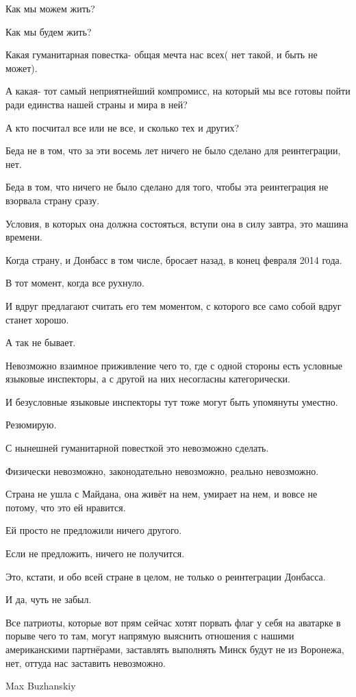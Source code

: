 Как мы можем жить?

Как мы будем жить?

Какая гуманитарная повестка- общая мечта нас всех( нет такой, и быть не может).

А какая- тот самый неприятнейший компромисс, на который мы все готовы пойти
ради единства нашей страны и мира в ней?

А кто посчитал все или не все, и сколько тех и других?

Беда не в том, что за эти восемь лет ничего не было сделано для реинтеграции,
нет.

Беда в том, что ничего не было сделано для того, чтобы эта реинтеграция не
взорвала страну сразу.

Условия, в которых она должна состояться, вступи она в силу завтра, это машина
времени.

Когда страну, и Донбасс в том числе, бросает назад, в конец февраля 2014 года.

В тот момент, когда все рухнуло.

И вдруг предлагают считать его тем моментом, с которого все само собой вдруг
станет хорошо.

А так не бывает.

Невозможно взаимное приживление чего то, где с одной стороны есть условные
языковые инспекторы, а с другой на них несогласны категорически.

И безусловные языковые инспекторы тут тоже могут быть упомянуты уместно.

Резюмирую.

С нынешней гуманитарной повесткой это невозможно сделать.

Физически невозможно, законодательно невозможно, реально невозможно.

Страна не ушла с Майдана, она живёт на нем, умирает на нем, и вовсе не потому,
что это ей нравится.

Ей просто не предложили ничего другого.

Если не предложить, ничего не получится.

Это, кстати, и обо всей стране в целом, не только о реинтеграции Донбасса.

И да, чуть не забыл.

Все патриоты, которые вот прям сейчас хотят порвать флаг у себя на аватарке в
порыве чего то там, могут напрямую выяснить отношения с нашими американскими
партнёрами, заставлять выполнять Минск будут не из Воронежа, нет, оттуда нас
заставить невозможно.

Max Buzhanskiy
